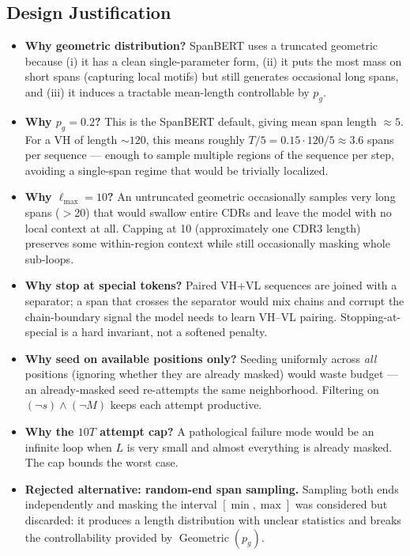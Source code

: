 \documentclass[11pt]{article}
\DeclareMathOperator{\Geom}{Geometric}
\begin{document}
\subsection{Design Justification}
\begin{itemize}
\item \textbf{Why geometric distribution?} SpanBERT uses a truncated
geometric because (i) it has a clean single-parameter form,
(ii) it puts the most mass on short spans (capturing local motifs) but
still generates occasional long spans, and (iii) it induces a
tractable mean-length controllable by $p_g$.
\item \textbf{Why $p_g = 0.2$?} This is the SpanBERT default, giving
mean span length $\approx 5$. For a VH of length $\sim 120$, this means
roughly $T/5 = 0.15 \cdot 120 / 5 \approx 3.6$ spans per sequence ---
enough to sample multiple regions of the sequence per step, avoiding
a single-span regime that would be trivially localized.
\item \textbf{Why $\ell_{\max} = 10$?} An untruncated geometric
occasionally samples very long spans ($>$20) that would swallow entire
CDRs and leave the model with no local context at all. Capping at 10
(approximately one CDR3 length) preserves some within-region context
while still occasionally masking whole sub-loops.
\item \textbf{Why stop at special tokens?} Paired VH+VL sequences are
joined with a separator; a span that crosses the separator would mix
chains and corrupt the chain-boundary signal the model needs to learn
VH--VL pairing. Stopping-at-special is a hard invariant, not a
softened penalty.
\item \textbf{Why seed on available positions only?} Seeding uniformly
across \emph{all} positions (ignoring whether they are already masked)
would waste budget --- an already-masked seed re-attempts the same
neighborhood. Filtering on $(\neg s) \wedge (\neg M)$ keeps each attempt
productive.
\item \textbf{Why the $10T$ attempt cap?} A pathological failure mode
would be an infinite loop when $L$ is very small and almost everything
is already masked. The cap bounds the worst case.
\item \textbf{Rejected alternative: random-end span sampling.} Sampling
both ends independently and masking the interval $[\min, \max]$ was
considered but discarded: it produces a length distribution with
unclear statistics and breaks the controllability provided by
$\Geom(p_g)$.
\end{itemize}
\end{document}
